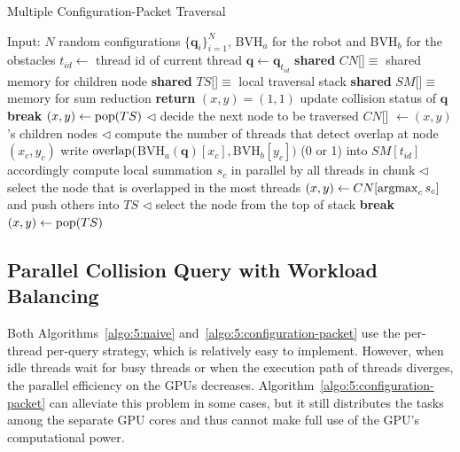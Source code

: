 \begin{algorithm}[htb]
    \caption{Multiple Configuration-Packet Traversal}
    \label{algo:5:configuration-packet}
    \begin{algorithmic}[1]
    \STATE Input: $N$ random configurations $\{\mathbf{q}_i\}_{i=1}^N$, BVH$_a$ for the robot and BVH$_b$ for the obstacles
    \STATE $t_{id} \leftarrow$ thread id of current thread
    \STATE $\mathbf{q} \leftarrow \mathbf{q}_{t_{id}}$
    \STATE \textbf{shared} $CN$[]$\equiv$ shared memory for children node
    \STATE \textbf{shared} $TS$[]$\equiv$ local traversal stack
    \STATE \textbf{shared} $SM$[]$\equiv$ memory for sum reduction
    \medskip
        \STATE \textbf{return}
    \ENDIF
    \STATE $(x,y) = (1,1)$
    \LOOP
            \STATE update collision status of $\mathbf{q}$
        \ENDIF
            \STATE \textbf{break}
        \ENDIF
        \STATE $(x,y) \leftarrow \operatorname{pop}(TS)$
        \ELSE \STATE $\lhd$ decide the next node to be traversed
            \STATE $CN$[] $\leftarrow (x,y)$'s children nodes
            \STATE $\lhd$ compute the number of threads that detect overlap at node $(x_c, y_c)$
            \STATE write $\operatorname{overlap}($BVH$_a(\mathbf{q})[x_c],$BVH$_b[y_c])$ (0 or 1) into $SM[t_{id}]$ accordingly
            \STATE compute local summation $s_c$ in parallel by all threads in chunk
            \ENDFOR
            \STATE $\lhd$ select the node that is overlapped in the most threads
            \STATE $(x,y) \leftarrow CN[\operatorname{argmax}_c{s_c}]$ and push others into $TS$
            \ELSE
            \STATE $\lhd$ select the node from the top of stack
                    \STATE \textbf{break}
                \ENDIF
                \STATE $(x,y) \leftarrow \operatorname{pop}(TS)$
            \ENDIF
        \ENDIF
    \ENDLOOP
    \end{algorithmic}
\end{algorithm}


\subsection{Parallel Collision Query with Workload Balancing}
Both Algorithms~\ref{algo:5:naive} and~\ref{algo:5:configuration-packet} use the per-thread per-query strategy, which is relatively easy to implement. However, when idle threads wait for busy threads or when the execution path of threads diverges, the parallel
efficiency on the GPUs decreases. Algorithm~\ref{algo:5:configuration-packet} can alleviate this problem in some cases, but it still distributes the tasks among the separate GPU cores and thus cannot make full use of the GPU's computational power.

